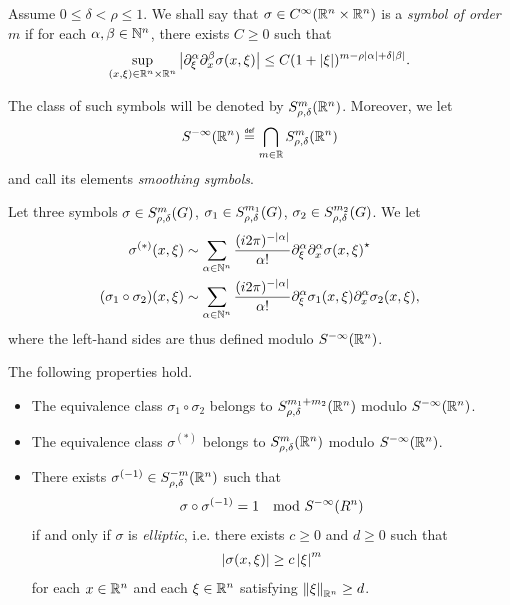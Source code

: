 \begin{definition}
    Assume $0 \leq \delta < \rho \leq 1$.
    We shall say that $\sigma \in \SmoothFunctions {\R^n \times \R^n}$ is a \emph{symbol of order $m$}
    if for each $\alpha, \beta \in \N^n$,
    there exists $C \geq 0$ such that
    \begin{align*}
        \sup_{(x, \xi) \in \R^n \times \R^n} \abs {\iD{\xi^\alpha} \iD{x^\beta}\sigma(x, \xi)} \leq C (1 + \abs \xi)^{m - \rho \abs \alpha + \delta \abs \beta}.
    \end{align*}

    The class of such symbols will be denoted by $\SymbolClass [\R^n] m {\rho, \delta}$.
    Moreover, we let
    \begin{align*}
        \SmoothingSymbols [\R^n] \defeq \bigcap_{m \in \R} \SymbolClass [\R^n] m {\rho, \delta}
    \end{align*}
    and call its elements \emph{smoothing symbols}.
\end{definition}

\begin{theorem}
    Let three symbols
    $\sigma \in \SymbolClass m {\rho, \delta}$,
    $\sigma_1 \in \SymbolClass {m_1} {\rho, \delta}$,
    $\sigma_2 \in \SymbolClass {m_2} {\rho, \delta}$.
    We let
    \begin{align*}
        \sigma^{(*)}(x, \xi) &\sim \sum_{\alpha \in \N^n} \frac {(\i \turn)^{-\abs \alpha}} {\alpha!} \iD{\xi^\alpha} \iD{x^\alpha} \adj{\sigma(x, \xi)}\\
        (\sigma_1 \circ \sigma_2)(x, \xi) &\sim \sum_{\alpha \in \N^n} \frac {(\i \turn)^{-\abs \alpha}} {\alpha!} \iD{\xi^\alpha} \sigma_1(x, \xi) \iD{x^\alpha} \sigma_2(x, \xi),
    \end{align*}
    where the left-hand sides are thus defined modulo $\SmoothingSymbols [\R^n]$.

    The following properties hold.
    \begin{itemize}
        \item The equivalence class $\sigma_1 \circ \sigma_2$ belongs to $\SymbolClass [\R^n] {m_1 + m_2} {\rho, \delta}$ modulo $\SmoothingSymbols [\R^n]$.
        \item The equivalence class $\sigma^{(*)}$ belongs to $\SymbolClass [\R^n] m {\rho, \delta}$ modulo $\SmoothingSymbols [\R^n]$.
        \item
            There exists $\sigma^{(-1)} \in \SymbolClass [\R^n] {-m} {\rho, \delta}$ such that
            \begin{align*}
                \sigma \circ \sigma^{(-1)} = 1 \quad \text{mod } \SmoothingSymbols [R^n]
            \end{align*}
            if and only if $\sigma$ is \emph{elliptic},
            i.e. there exists $c \geq 0$ and $d \geq 0$ such that
            \begin{align*}
                \abs {\sigma(x, \xi)} \geq c \abs \xi^m
            \end{align*}
            for each $x \in \R^n$ and each $\xi \in \R^n$ satisfying $\norm [\R^n] \xi \geq d$.
    \end{itemize}
\end{theorem}

